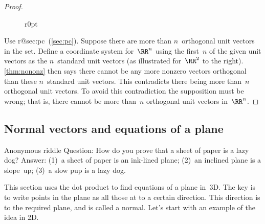 \begin{proof} 
\begin{figure}r{0pt}
\end{figure}
Use %
\ifcsname r@sec:pc\endcsname\ (\cref{sec:pc})\fi.
Suppose there are more than \(n\)~orthogonal unit vectors in the set.
Define a coordinate system for~\(\RR^n\) using the first~\(n\) of the given unit vectors as the \(n\)~standard unit vectors 
(as illustrated for~\(\RR^2\) to the right).
\cref{thm:nononz} then says there cannot be any more nonzero vectors orthogonal than these \(n\)~standard unit vectors.
This contradicts there being more than~\(n\) orthogonal unit vectors.
To avoid this contradiction the supposition must be wrong; that is, there cannot be more than~\(n\) orthogonal unit vectors in~\(\RR^n\).
\par
\end{proof}








\subsection{Normal vectors and equations of a plane}
\label{sec:nvep}


\begin{quoted}{Anonymous riddle}
Question: How do you prove that a sheet of paper is a lazy dog?  Answer: (1)~a sheet of paper is an ink-lined plane; (2)~an inclined plane is a slope~up; (3)~a slow pup is a lazy dog.
\end{quoted}

This section uses the dot product to find equations of a plane in~3D.
The key is to write points in the plane as all those at  to a certain direction.  
This direction is  to the required plane, and is called a normal.
Let's start with an example of the idea in 2D.


